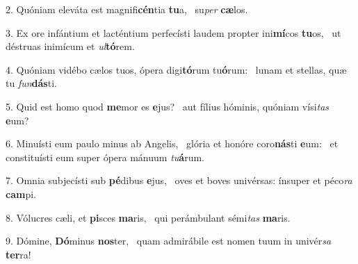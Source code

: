 2. Quóniam eleváta est magnifi\textbf{cén}tia \textbf{tu}a, \ast\  su\textit{per} \textbf{cæ}los.\

3. Ex ore infántium et lacténtium perfecísti laudem propter ini\textbf{mí}cos \textbf{tu}os, \ast\  ut déstruas inimícum et \textit{ul}\textbf{tó}rem.\

4. Quóniam vidébo cælos tuos, ópera digi\textbf{tó}rum tu\textbf{ó}rum: \ast\  lunam et stellas, quæ tu \textit{fun}\textbf{dás}ti.\

5. Quid est homo quod \textbf{me}mor es \textbf{e}jus? \ast\  aut fílius hóminis, quóniam vísi\textit{tas} \textbf{e}um?\

6. Minuísti eum paulo minus ab Angelis, \dag\  glória et honóre coro\textbf{nás}ti \textbf{e}um: \ast\  et constituísti eum super ópera mánuum \textit{tu}\textbf{á}rum.\

7. Omnia subjecísti sub \textbf{pé}dibus \textbf{e}jus, \ast\  oves et boves univérsas: ínsuper et péco\textit{ra} \textbf{cam}pi.\

8. Vólucres cæli, et \textbf{pi}sces \textbf{ma}ris, \ast\  qui perámbulant sémi\textit{tas} \textbf{ma}ris.\

9. Dómine, \textbf{Dó}minus \textbf{nos}ter, \ast\  quam admirábile est nomen tuum in univér\textit{sa} \textbf{ter}ra!\

